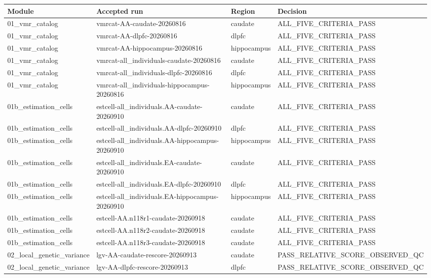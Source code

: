 \begin{tabular}{llll}
\toprule
Module & Accepted run & Region & Decision \\
\midrule
01\_vmr\_catalog & vmrcat-AA-caudate-20260816 & caudate & ALL\_FIVE\_CRITERIA\_PASS \\
01\_vmr\_catalog & vmrcat-AA-dlpfc-20260816 & dlpfc & ALL\_FIVE\_CRITERIA\_PASS \\
01\_vmr\_catalog & vmrcat-AA-hippocampus-20260816 & hippocampus & ALL\_FIVE\_CRITERIA\_PASS \\
01\_vmr\_catalog & vmrcat-all\_individuals-caudate-20260816 & caudate & ALL\_FIVE\_CRITERIA\_PASS \\
01\_vmr\_catalog & vmrcat-all\_individuals-dlpfc-20260816 & dlpfc & ALL\_FIVE\_CRITERIA\_PASS \\
01\_vmr\_catalog & vmrcat-all\_individuals-hippocampus-20260816 & hippocampus & ALL\_FIVE\_CRITERIA\_PASS \\
01b\_estimation\_cells & estcell-all\_individuals.AA-caudate-20260910 & caudate & ALL\_FIVE\_CRITERIA\_PASS \\
01b\_estimation\_cells & estcell-all\_individuals.AA-dlpfc-20260910 & dlpfc & ALL\_FIVE\_CRITERIA\_PASS \\
01b\_estimation\_cells & estcell-all\_individuals.AA-hippocampus-20260910 & hippocampus & ALL\_FIVE\_CRITERIA\_PASS \\
01b\_estimation\_cells & estcell-all\_individuals.EA-caudate-20260910 & caudate & ALL\_FIVE\_CRITERIA\_PASS \\
01b\_estimation\_cells & estcell-all\_individuals.EA-dlpfc-20260910 & dlpfc & ALL\_FIVE\_CRITERIA\_PASS \\
01b\_estimation\_cells & estcell-all\_individuals.EA-hippocampus-20260910 & hippocampus & ALL\_FIVE\_CRITERIA\_PASS \\
01b\_estimation\_cells & estcell-AA.n118r1-caudate-20260918 & caudate & ALL\_FIVE\_CRITERIA\_PASS \\
01b\_estimation\_cells & estcell-AA.n118r2-caudate-20260918 & caudate & ALL\_FIVE\_CRITERIA\_PASS \\
01b\_estimation\_cells & estcell-AA.n118r3-caudate-20260918 & caudate & ALL\_FIVE\_CRITERIA\_PASS \\
02\_local\_genetic\_variance & lgv-AA-caudate-rescore-20260913 & caudate & PASS\_RELATIVE\_SCORE\_OBSERVED\_QC \\
02\_local\_genetic\_variance & lgv-AA-dlpfc-rescore-20260913 & dlpfc & PASS\_RELATIVE\_SCORE\_OBSERVED\_QC \\

\end{tabular}
